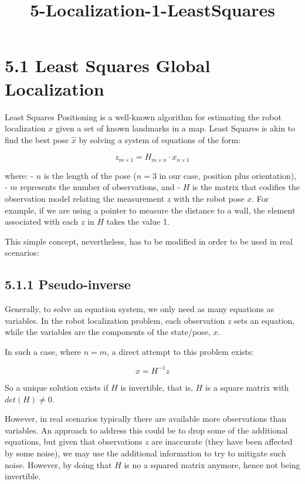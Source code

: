 \documentclass[11pt]{article}
\title{5-Localization-1-LeastSquares}
\begin{document}
    
    \maketitle
    
    

    
    \hypertarget{least-squares-global-localization}{%
\section{5.1 Least Squares Global
Localization}\label{least-squares-global-localization}}

Least Squares Positioning is a well-known algorithm for estimating the
robot localization \(x\) given a set of known landmarks in a map. Least
Squares is akin to find the best pose \(\hat{x}\) by solving a system of
equations of the form:

\[z_{m \times 1} = H_{m \times n} \cdot x_{n \times 1}\]

where: - \(n\) is the length of the pose (\(n=3\) in our case, position
plus orientation), - \(m\) represents the number of observations, and -
\(H\) is the matrix that codifies the observation model relating the
measurement \(z\) with the robot pose \(x\). For example, if we are
using a pointer to measure the distance to a wall, the element
associated with each \(z\) in \(H\) takes the value 1.

This simple concept, nevertheless, has to be modified in order to be
used in real scenarios:

    \hypertarget{pseudo-inverse}{%
\subsection{5.1.1 Pseudo-inverse}\label{pseudo-inverse}}

Generally, to solve an equation system, we only need as many equations
as variables. In the robot localization problem, each observation \(z\)
sets an equation, while the variables are the components of the
state/pose, \(x\).

In such a case, where \(n=m\), a direct attempt to this problem exists:

\[x = H ^{-1} z\]

So a unique solution exists if \(H\) is invertible, that is, \(H\) is a
square matrix with \(det(H) \neq 0\).

However, in real scenarios typically there are available more
observations than variables. An approach to address this could be to
drop some of the additional equations, but given that observations \(z\)
are inaccurate (they have been affected by some noise), we may use the
additional information to try to mitigate such noise. However, by doing
that \(H\) is no a squared matrix anymore, hence not being invertible.
\end{document}
